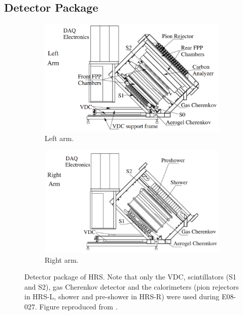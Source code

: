 \subsection{Detector Package}
\label{C5S4SS2}

\begin{figure}[b!]
  \centering
  \begin{subfigure}[t]{0.49\textwidth}
    \includegraphics[width=\textwidth]{figs/detector-package-left.png}
    \caption{Left arm. \label{C5S4SS2F1a}}
  \end{subfigure}
  \begin{subfigure}[t]{0.49\textwidth}
    \includegraphics[width=\textwidth]{figs/detector-package-right.png}
    \caption{Right arm. \label{C5S4SS2F1b}}
  \end{subfigure}
  \caption[Detector package of HRS.]{Detector package of HRS. Note that only the VDC, scintillators (S1 and S2), gas Cherenkov detector and the calorimeters (pion rejectors in HRS-L, shower and pre-shower in HRS-R) were used during E08-027. Figure reproduced from \cite{Alcorn2004}. \label{C5S4SS2F1}}
\end{figure}

